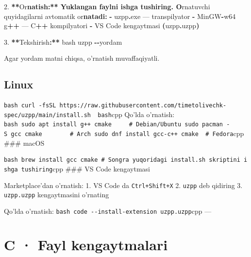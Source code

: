 \documentclass[a4paper,11pt,twoside,openright]{book}
\newenvironment{Shaded}{\begin{snugshade}}{\end{snugshade}}
\newcommand{\CharTok}[1]{\textcolor[rgb]{0.31,0.60,0.02}{#1}}
\newcommand{\ErrorTok}[1]{\textcolor[rgb]{0.64,0.00,0.00}{\textbf{#1}}}
\newcommand{\FloatTok}[1]{\textcolor[rgb]{0.00,0.00,0.81}{#1}}
\newcommand{\NormalTok}[1]{#1}
\newcommand{\OperatorTok}[1]{\textcolor[rgb]{0.81,0.36,0.00}{\textbf{#1}}}
\begin{document}
\begin{Shaded}
\begin{Highlighting}[]
\FloatTok{2.} \OperatorTok{**}\NormalTok{O}\CharTok{\textquotesingle{}r}\ErrorTok{natish:** Yuklangan faylni ishga tushiring. O}\CharTok{\textquotesingle{}}\NormalTok{rnatuvchi quyidagilarni avtomatik o}\CharTok{\textquotesingle{}r}\ErrorTok{natadi:}
   \OperatorTok{{-}} \ErrorTok{\textasciigrave{}}\NormalTok{uzpp}\OperatorTok{.}\NormalTok{exe}\ErrorTok{\textasciigrave{}}\NormalTok{ — transpilyator}
   \OperatorTok{{-}}\NormalTok{ MinGW}\OperatorTok{{-}}\NormalTok{w64 }\ErrorTok{\textasciigrave{}}\NormalTok{g}\OperatorTok{++}\ErrorTok{\textasciigrave{}}\NormalTok{ — C}\OperatorTok{++}\NormalTok{ kompilyatori}
   \OperatorTok{{-}}\NormalTok{ VS Code kengaytmasi }\OperatorTok{(}\ErrorTok{\textasciigrave{}}\NormalTok{uzpp}\OperatorTok{.}\NormalTok{uzpp}\ErrorTok{\textasciigrave{}}\OperatorTok{)}

\FloatTok{3.} \OperatorTok{**}\NormalTok{Tekshirish}\OperatorTok{:**}
   \ErrorTok{\textasciigrave{}\textasciigrave{}\textasciigrave{}}\NormalTok{bash}
\NormalTok{   uzpp }\OperatorTok{{-}{-}}\NormalTok{yordam}
\end{Highlighting}
\end{Shaded}

Agar yordam matni chiqsa, o'rnatish muvaffaqiyatli.

\subsection{Linux}\label{linux}

\texttt{bash\ curl\ -fsSL\ https://raw.githubusercontent.com/timetolivechk-spec/uzpp/main/install.sh\ \textbar{}\ bash}cpp
Qo'lda o'rnatish:
\texttt{bash\ sudo\ apt\ install\ g++\ cmake\ \ \ \ \ \#\ Debian/Ubuntu\ sudo\ pacman\ -S\ gcc\ cmake\ \ \ \ \ \ \ \ \#\ Arch\ sudo\ dnf\ install\ gcc-c++\ cmake\ \ \#\ Fedora}cpp
\#\#\# macOS

\texttt{bash\ brew\ install\ gcc\ cmake\ \#\ So\textquotesingle{}ngra\ yuqoridagi\ install.sh\ skriptini\ ishga\ tushiring}cpp
\#\#\# VS Code kengaytmasi

Marketplace'dan o'rnatish: 1. VS Code da \texttt{Ctrl+Shift+X} 2. \texttt{uzpp}
deb qidiring 3. \texttt{uzpp.uzpp} kengaytmasini o'rnating

Qo'lda o'rnatish: \texttt{bash\ code\ -\/-install-extension\ uzpp.uzpp}cpp ---

\section{C · Fayl kengaytmalari}\label{c-fayl-kengaytmalari}
\end{document}

